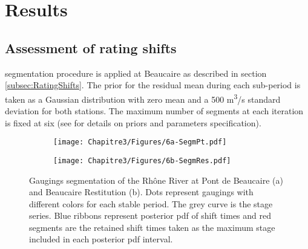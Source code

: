  \section{Results}
 \label{sec:Results}
 
    \subsection{Assessment of rating shifts}

    \citet{darienzo_detection_2021} segmentation procedure is applied at Beaucaire as described in section \ref{subsec:RatingShifts}. The prior for the residual mean during each sub-period is taken as a Gaussian distribution with zero mean and a 500 m\textsuperscript{3}/s standard deviation for both stations. The maximum number of segments at each iteration is fixed at six (see \citet{darienzo_detection_2021} for details on priors and parameters specification).

    \begin{figure}[h!]
        \centering
        \begin{subfigure}{0.75\textwidth}
        	\centering
        	\texttt{[image: Chapitre3/Figures/6a-SegmPt.pdf]}
        	\caption{}
		\end{subfigure}
		\begin{subfigure}{0.75\textwidth}
        	\centering
        	\texttt{[image: Chapitre3/Figures/6b-SegmRes.pdf]}
        	\caption{}
		\end{subfigure} 
		\caption{Gaugings segmentation of the Rhône River at Pont de Beaucaire (a) and Beaucaire Restitution (b). Dots represent gaugings with different colors for each stable period. The grey curve is the stage series. Blue ribbons represent posterior pdf of shift times and red segments are the retained shift times taken as the maximum stage included in each posterior pdf interval.}
        \label{fig:SegmBoth}
    \end{figure}
    
